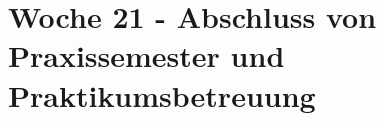 \section{Woche 21 - Abschluss von Praxissemester und Praktikumsbetreuung} \label{sec:bericht-wo-21}






